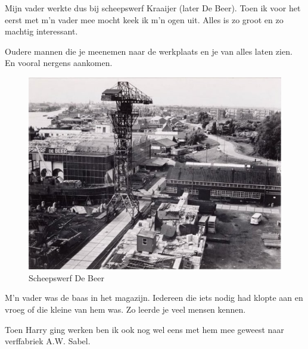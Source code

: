 \documentclass[12pt,twoside, openright]{memoir}
\begin{document}
Mijn vader werkte dus bij scheepswerf Kraaijer (later De Beer). Toen ik voor het eerst met m’n vader mee mocht keek ik m’n ogen uit. Alles is zo groot en zo machtig interessant.

Oudere mannen die je meenemen naar de werkplaats en je van alles laten zien. En vooral nergens aankomen. 

\begin{figure}
\centering
\includegraphics[width=\textwidth]{img/196debeer}
\caption*{\footnotesize Scheepswerf De Beer}
\end{figure}

M’n vader was de baas in het magazijn. Iedereen die iets nodig had klopte aan en vroeg of die kleine van hem was. Zo leerde je veel mensen kennen. 




Toen Harry ging werken ben ik ook nog wel eens met hem mee geweest naar verffabriek A.W. Sabel. 
\end{document}
